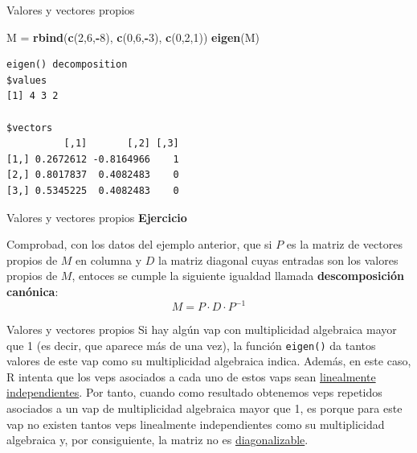\documentclass[
  ignorenonframetext,
  aspectratio=169]{beamer}
\newenvironment{Shaded}{\begin{snugshade}}{\end{snugshade}}
\newcommand{\DecValTok}[1]{\textcolor[rgb]{0.00,0.00,0.81}{#1}}
\newcommand{\FunctionTok}[1]{\textcolor[rgb]{0.13,0.29,0.53}{\textbf{#1}}}
\newcommand{\NormalTok}[1]{#1}
\newcommand{\OtherTok}[1]{\textcolor[rgb]{0.56,0.35,0.01}{#1}}
\newcommand{\SpecialCharTok}[1]{\textcolor[rgb]{0.81,0.36,0.00}{\textbf{#1}}}
\begin{document}
\begin{frame}[fragile]{Valores y vectores propios}
\label{valores-y-vectores-propios-1}
\begin{Shaded}
\begin{Highlighting}[]
\NormalTok{M }\OtherTok{=} \FunctionTok{rbind}\NormalTok{(}\FunctionTok{c}\NormalTok{(}\DecValTok{2}\NormalTok{,}\DecValTok{6}\NormalTok{,}\SpecialCharTok{{-}}\DecValTok{8}\NormalTok{), }\FunctionTok{c}\NormalTok{(}\DecValTok{0}\NormalTok{,}\DecValTok{6}\NormalTok{,}\SpecialCharTok{{-}}\DecValTok{3}\NormalTok{), }\FunctionTok{c}\NormalTok{(}\DecValTok{0}\NormalTok{,}\DecValTok{2}\NormalTok{,}\DecValTok{1}\NormalTok{))}
\FunctionTok{eigen}\NormalTok{(M)}
\end{Highlighting}
\end{Shaded}

\begin{verbatim}
eigen() decomposition
$values
[1] 4 3 2

$vectors
          [,1]       [,2] [,3]
[1,] 0.2672612 -0.8164966    1
[2,] 0.8017837  0.4082483    0
[3,] 0.5345225  0.4082483    0
\end{verbatim}
\end{frame}

\begin{frame}{Valores y vectores propios}
\label{valores-y-vectores-propios-2}
\textbf{Ejercicio}

Comprobad, con los datos del ejemplo anterior, que si \(P\) es la matriz
de vectores propios de \(M\) en columna y \(D\) la matriz diagonal cuyas
entradas son los valores propios de \(M\), entoces se cumple la
siguiente igualdad llamada \textbf{descomposición canónica}:
\[M = P\cdot D\cdot P^{-1}\]
\end{frame}

\begin{frame}[fragile]{Valores y vectores propios}
\label{valores-y-vectores-propios-3}
Si hay algún vap con multiplicidad algebraica mayor que 1 (es decir, que
aparece más de una vez), la función \texttt{eigen()} da tantos valores
de este vap como su multiplicidad algebraica indica. Además, en este
caso, R intenta que los veps asociados a cada uno de estos vaps sean
\href{https://es.wikipedia.org/wiki/Dependencia_e_independencia_lineal}{linealmente
independientes}. Por tanto, cuando como resultado obtenemos veps
repetidos asociados a un vap de multiplicidad algebraica mayor que 1, es
porque para este vap no existen tantos veps linealmente independientes
como su multiplicidad algebraica y, por consiguiente, la matriz no es
\href{https://es.wikipedia.org/wiki/Matriz_diagonalizable}{diagonalizable}.
\end{frame}
\end{document}
